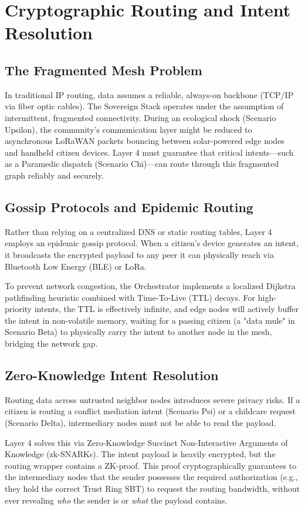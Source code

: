 \chapter{Cryptographic Routing and Intent Resolution}

\section{The Fragmented Mesh Problem}
In traditional IP routing, data assumes a reliable, always-on backbone (TCP/IP via fiber optic cables). The Sovereign Stack operates under the assumption of intermittent, fragmented connectivity. During an ecological shock (Scenario Upsilon), the community's communication layer might be reduced to asynchronous LoRaWAN packets bouncing between solar-powered edge nodes and handheld citizen devices. Layer 4 must guarantee that critical intents—such as a Paramedic dispatch (Scenario Chi)—can route through this fragmented graph reliably and securely.

\section{Gossip Protocols and Epidemic Routing}
Rather than relying on a centralized DNS or static routing tables, Layer 4 employs an epidemic gossip protocol. When a citizen's device generates an intent, it broadcasts the encrypted payload to any peer it can physically reach via Bluetooth Low Energy (BLE) or LoRa. 

To prevent network congestion, the Orchestrator implements a localized Dijkstra pathfinding heuristic combined with Time-To-Live (TTL) decays. For high-priority intents, the TTL is effectively infinite, and edge nodes will actively buffer the intent in non-volatile memory, waiting for a passing citizen (a "data mule" in Scenario Beta) to physically carry the intent to another node in the mesh, bridging the network gap.

\section{Zero-Knowledge Intent Resolution}
Routing data across untrusted neighbor nodes introduces severe privacy risks. If a citizen is routing a conflict mediation intent (Scenario Psi) or a childcare request (Scenario Delta), intermediary nodes must not be able to read the payload.

Layer 4 solves this via Zero-Knowledge Succinct Non-Interactive Arguments of Knowledge (zk-SNARKs). The intent payload is heavily encrypted, but the routing wrapper contains a ZK-proof. This proof cryptographically guarantees to the intermediary nodes that the sender possesses the required authorization (e.g., they hold the correct Trust Ring SBT) to request the routing bandwidth, without ever revealing \textit{who} the sender is or \textit{what} the payload contains. 


